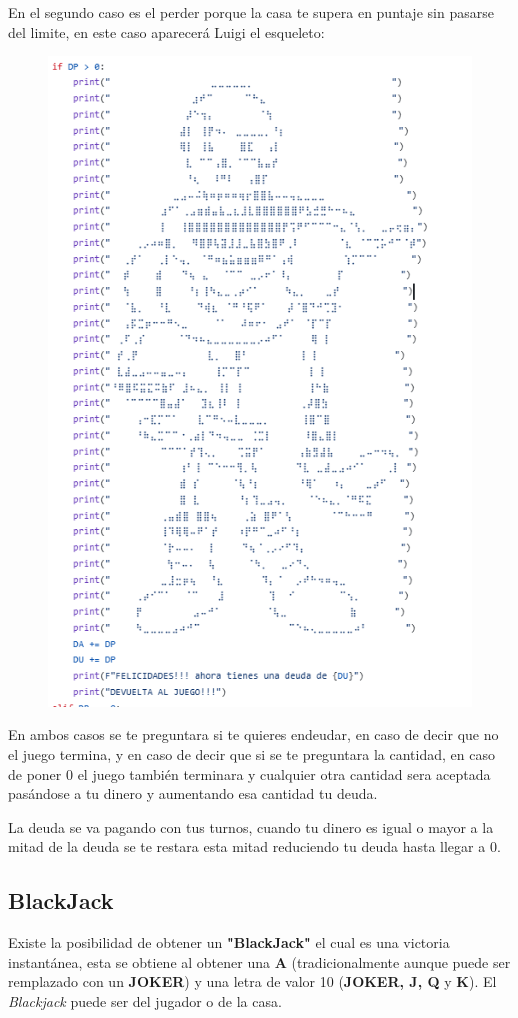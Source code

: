 \newpage

En el segundo caso es el perder porque la casa te supera en puntaje sin pasarse del limite, en este caso aparecerá Luigi el esqueleto:
\begin{figure}[h]
    \raggedright
    \includegraphics[width=0.7\linewidth]{Imagenes/luigi.PNG}
    \label{fig:}
\end{figure}

En ambos casos se te preguntara si te quieres endeudar, en caso de decir que no el juego termina, y en caso de decir que si se te preguntara la  cantidad, en caso de poner 0 el juego también terminara y cualquier otra cantidad sera aceptada pasándose a tu dinero y aumentando esa cantidad tu deuda.

La deuda se va pagando con tus turnos, cuando tu dinero es igual o mayor a la mitad de la deuda se te restara esta mitad reduciendo tu deuda hasta llegar a 0.

\newpage

\subsection{BlackJack}

Existe la posibilidad de obtener un \textbf{"BlackJack"} el cual es una victoria instantánea, esta se obtiene al obtener una \textbf{A} (tradicionalmente aunque puede ser remplazado con un \textbf{JOKER}) y una letra de valor 10 (\textbf{JOKER, J, Q} y \textbf{K}). El \textit{Blackjack} puede ser del jugador o de la casa.

